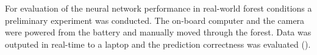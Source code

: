 For evaluation of the neural network performance in real-world forest conditions a preliminary experiment was conducted. The on-board computer and the camera were powered from  the battery and manually moved through the forest. Data was outputed in real-time to a laptop and the prediction correctness was evaluated ().


\begin{figure}[!h]
  \begin{minipage}{.5\linewidth}
  \centering
  \end{minipage}
  \begin{minipage}{.5\linewidth}
  \centering	
  

  \end{minipage}
  

\end{figure}
